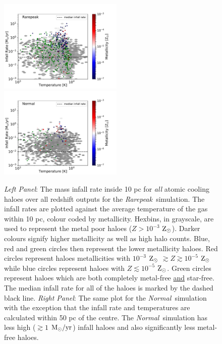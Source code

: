 \documentclass[graphics, twocolumn, usenatbib]{mn2e}
\newcommand{\msolaryrc} {$\rm{M_{\odot}/yr}$}
\newcommand{\zsolar} {$\rm{Z_{\odot}}~$}
\newcommand{\zsolarc} {$\rm{Z_{\odot}}$}
\newcommand{\rarepeak} {\textit{Rarepeak~}}
\newcommand{\normal} {\textit{Normal~}}
\begin{document}
\begin{figure}
\centering
\begin{minipage}{175mm}      \begin{center} 
\centerline{
\includegraphics[width=0.525\textwidth]{FIGURES/Rarepeak_MdotTZ.pdf}
\includegraphics[width=0.525\textwidth]{FIGURES/Normal_MdotTZ.pdf}}
\caption{\textit{Left Panel}: The mass infall rate inside 10 pc for \textit{all} atomic
  cooling haloes over all redshift outputs for the \rarepeak simulation. The infall rates are plotted
  against the average temperature of the gas within 10 pc, colour coded by metallicity. Hexbins, in
  grayscale, are used to represent the metal poor haloes ($Z > 10^{-3}$ \zsolarc). Darker colours
  signify higher metallicity as well as high halo counts. Blue, red and green circles then
  represent the lower metallicity haloes. Red circles represent haloes metallicities
  with $10^{-3} $ \zsolar $\gtrsim Z \gtrsim 10^{-5}$ \zsolarc while blue circles represent
  haloes with $Z \lesssim 10^{-5}$ \zsolarc. Green circles represent haloes which are both
  completely metal-free \underline{and} star-free. The median infall rate for all of the haloes
  is marked by the dashed black line. \textit{Right Panel}: The same plot for the \normal simulation
  with the exception that the infall rate and temperatures are calculated within 50 pc of the centre.
  The \normal simulation has less high ($ \gtrsim 1 $ \msolaryrc) infall haloes and also
  significantly less metal-free haloes.} \label{Fig:Scatter}
\end{center} \end{minipage}

\end{figure}
\end{document}
